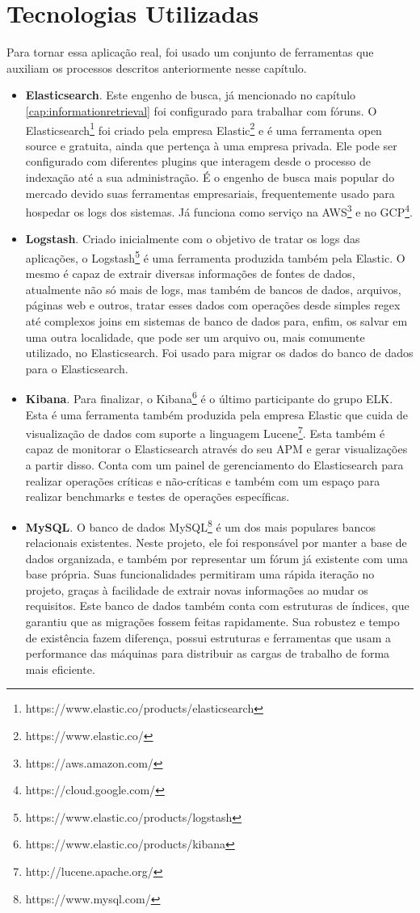 \section{Tecnologias Utilizadas}
Para tornar essa aplicação real, foi usado um conjunto de ferramentas que auxiliam os processos descritos anteriormente nesse capítulo.
\begin{itemize}
    \item \textbf{Elasticsearch}. Este engenho de busca, já mencionado no capítulo \ref{cap:informationretrieval} foi configurado para trabalhar com fóruns. O Elasticsearch\footnote{https://www.elastic.co/products/elasticsearch} foi criado pela empresa Elastic\footnote{https://www.elastic.co/} e é uma ferramenta open source e gratuita, ainda que pertença à uma empresa privada. Ele pode ser configurado com diferentes plugins que interagem desde o processo de indexação até a sua administração. É o engenho de busca mais popular do mercado devido suas ferramentas empresariais, frequentemente usado para hospedar os logs dos sistemas. Já funciona como serviço na AWS\footnote{https://aws.amazon.com/} e no GCP\footnote{https://cloud.google.com/}.
    \item \textbf{Logstash}. Criado inicialmente com o objetivo de tratar os logs das aplicações, o Logstash\footnote{https://www.elastic.co/products/logstash} é uma ferramenta produzida também pela Elastic. O mesmo é capaz de extrair diversas informações de fontes de dados, atualmente não só mais de logs, mas também de bancos de dados, arquivos, páginas web e outros, tratar esses dados com operações desde simples regex até complexos joins em sistemas de banco de dados para, enfim, os salvar em uma outra localidade, que pode ser um arquivo ou, mais comumente utilizado, no Elasticsearch. Foi usado para migrar os dados do banco de dados para o Elasticsearch.
    \item \textbf{Kibana}. Para finalizar, o Kibana\footnote{https://www.elastic.co/products/kibana} é o último participante do grupo \acs{ELK}. Esta é uma ferramenta também produzida pela empresa Elastic que cuida de visualização de dados com suporte a linguagem Lucene\footnote{http://lucene.apache.org/}. Esta também é capaz de monitorar o Elasticsearch através do seu \ac{APM} e gerar visualizações a partir disso. Conta com um painel de gerenciamento do Elasticsearch para realizar operações críticas e não-críticas e também com um espaço para realizar benchmarks e testes de operações específicas.
    \item \textbf{MySQL}. O banco de dados MySQL\footnote{https://www.mysql.com/} é um dos mais populares bancos relacionais existentes. Neste projeto, ele foi responsável por manter a base de dados organizada, e também por representar um fórum já existente com uma base própria. Suas funcionalidades permitiram uma rápida iteração no projeto, graças à facilidade de extrair novas informações ao mudar os requisitos. Este banco de dados também conta com estruturas de índices, que garantiu que as migrações fossem feitas rapidamente. Sua robustez e tempo de existência fazem diferença, possui estruturas e ferramentas que usam a performance das máquinas para distribuir as cargas de trabalho de forma mais eficiente.

\end{itemize}
